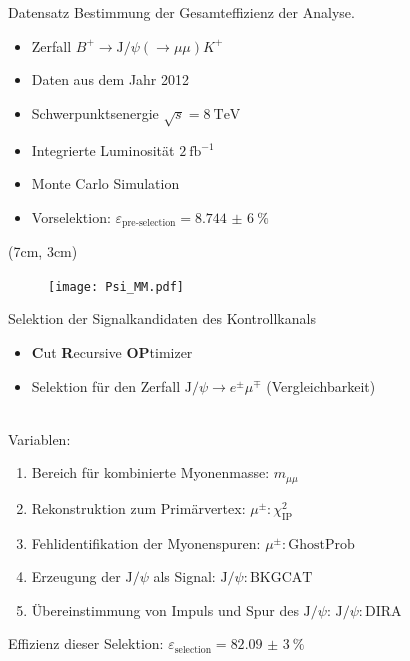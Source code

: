 \begin{frame}[t]{Datensatz}
  Bestimmung der Gesamteffizienz der Analyse.
  \begin{itemize} \setlength\itemsep{0.4cm}
    \item Zerfall $B^+\rightarrow\text{J}/\psi(\rightarrow\mu\mu)K^+$
    \item Daten aus dem Jahr 2012
    \item Schwerpunktsenergie $\sqrt{s}=\SI{8}{\tera\electronvolt}$
    \item Integrierte Luminosität $\SI{2}{\femto\barn^{-1}}$
    \item Monte Carlo Simulation
    \item Vorselektion: $\varepsilon_\text{pre-selection}=\SI{8,744(6)}{\percent}$
  \end{itemize}
  \begin{textblock*}{8.5cm}(7cm, 3cm)
    \begin{figure}
      \texttt{[image: Psi\_MM.pdf]}
    \end{figure}
  \end{textblock*}
\end{frame}

\begin{frame}[t]{Selektion der Signalkandidaten des Kontrollkanals}
      \begin{itemize}
        \item \textbf{C}ut \textbf{R}ecursive \textbf{OP}timizer
        \item Selektion für den Zerfall $\text{J}/\psi\rightarrow e^{\pm}\mu^{\mp}$ (Vergleichbarkeit)
      \end{itemize} \pause
      \ \\
      Variablen:
      \begin{enumerate}
        \item Bereich für kombinierte Myonenmasse: \quad $m_{\mu\mu}$ \pause
        \item Rekonstruktion zum Primärvertex: \quad $\mu^{\pm}:\chi_\text{IP}^2$ \pause
        \item Fehlidentifikation der Myonenspuren: \quad $\mu^{\pm}: \text{GhostProb}$ \pause
        \item Erzeugung der $\text{J}/\psi$ als Signal: \quad $\text{J}/\psi: \text{BKGCAT}$ \pause
        \item Übereinstimmung von Impuls und Spur des $\text{J}/\psi$: \quad $\text{J}/\psi: \text{DIRA}$ \pause
      \end{enumerate}
      \begin{framed}
      \centering
        Effizienz dieser Selektion: $\varepsilon_\text{selection}=\SI{82,09(3)}{\percent}$
      \end{framed}
\end{frame}

